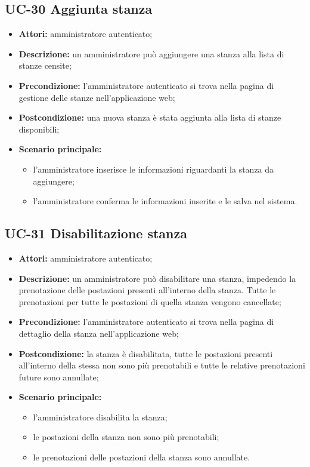 \subsection{UC-30 Aggiunta stanza}
\begin{itemize}
    \item \textbf{Attori:} amministratore autenticato;
    \item \textbf{Descrizione:} un amministratore pu\`{o} aggiungere una stanza alla lista di stanze censite;
    \item \textbf{Precondizione:} l'amministratore autenticato si trova nella pagina di gestione delle stanze nell'applicazione web;
    \item \textbf{Postcondizione:} una nuova stanza \`{e} stata aggiunta alla lista di stanze disponibili;
    \item \textbf{Scenario principale:}
    \begin{itemize}
        \item l'amministratore inserisce le informazioni riguardanti la stanza da aggiungere;
        \item l'amministratore conferma le informazioni inserite e le salva nel sistema.
    \end{itemize}
\end{itemize}


\subsection{UC-31 Disabilitazione stanza}
\begin{itemize}
    \item \textbf{Attori:} amministratore autenticato;
    \item \textbf{Descrizione:} un amministratore pu\`{o} disabilitare una stanza, impedendo la prenotazione delle postazioni presenti all'interno della stanza. Tutte le prenotazioni per tutte le postazioni di quella stanza vengono cancellate;
    \item \textbf{Precondizione:} l'amministratore autenticato si trova nella pagina di dettaglio della stanza nell'applicazione web;
    \item \textbf{Postcondizione:} la stanza \`{e} disabilitata, tutte le postazioni presenti all'interno della stessa non sono pi\`{u} prenotabili e tutte le relative prenotazioni future sono annullate;
    \item \textbf{Scenario principale:}
    \begin{itemize}
        \item l'amministratore disabilita la stanza;
        \item le postazioni della stanza non sono pi\`{u} prenotabili;
        \item le prenotazioni delle postazioni della stanza sono annullate.
    \end{itemize}
\end{itemize}


